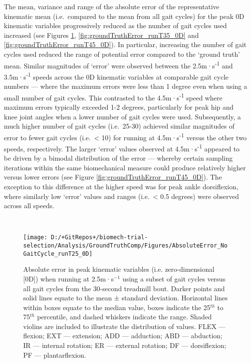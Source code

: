 \documentclass[]{elsarticle} %
\begin{document}
The mean, variance and range of the absolute error of the representative
kinematic mean (i.e.~compared to the mean from all gait cycles) for the
peak 0D kinematic variables progressively reduced as the number of gait
cycles used increased (see Figures \ref{fig:groundTruthError_runT25_0D},
\ref{fig:groundTruthError_runT35_0D} and
\ref{fig:groundTruthError_runT45_0D}). In particular, increasing the
number of gait cycles used reduced the range of potential error compared
to the `ground truth' mean. Similar magnitudes of `error' were observed
between the 2.5m·s\textsuperscript{-1} and 3.5m·s\textsuperscript{-1}
speeds across the 0D kinematic variables at comparable gait cycle
numbers --- where the maximum errors were less than 1 degree even when
using a small number of gait cycles. This contrasted to the
4.5m·s\textsuperscript{-1} speed where maximum errors typically exceeded
1-2 degrees, particularly for peak hip and knee joint angles when a
lower number of gait cycles were used. Subsequently, a much higher
number of gait cycles (i.e.~25-30) achieved similar magnitudes of error
to fewer gait cycles (i.e.~\textless{} 10) for running at
4.5m·s\textsuperscript{-1} versus the other two speeds, respectively.
The larger `error' values observed at 4.5m·s\textsuperscript{-1}
appeared to be driven by a bimodal distribution of the error --- whereby
certain sampling iterations within the same biomechanical measure could
produce relatively higher versus lower errors (see Figure
\ref{fig:groundTruthError_runT45_0D}). The exception to this difference
at the higher speed was for peak ankle dorsiflexion, where similarly low
`error' values and ranges (i.e.~\textless{} 0.5 degrees) were observed
across all speeds.

~

\begin{figure}

{\centering \texttt{[image: D:/+GitRepos+/biomech-trial-selection/Analysis/GroundTruthComp/Figures/AbsoluteError\_NoGaitCycle\_runT25\_0D]} 

}

\caption{Absolute error in peak kinematic variables (i.e. zero-dimensional [0D]) when running at 2.5m·s$^{-1}$ using a subset of gait cycles versus all gait cycles from the 30-second treadmill bout. Darker points and solid lines equate to the mean ± standard deviation. Horizontal lines within boxes equate to the median value, boxes indicate the 25$^{th}$ to 75$^{th}$ percentile, and dashed whiskers indicate the range. Shaded violins are included to illustrate the distribution of values. FLEX — flexion; EXT — extension; ADD — adduction; ABD — abduction; IR — internal rotation; ER — external rotation; DF — dorsiflexion; PF — plantarflexion.}\label{fig:groundTruthError_runT25_0D}
\end{figure}
\end{document}
